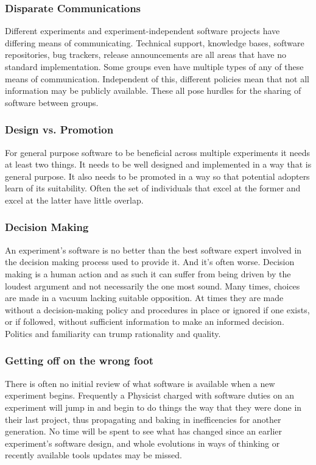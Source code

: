 \subsubsection{Disparate Communications}

Different experiments and experiment-independent software projects
have differing means of communicating.  Technical support, knowledge
bases, software repositories, bug trackers, release announcements are
all areas that have no standard implementation.  Some groups even
have multiple types of any of these means of communication.
Independent of this, different policies mean that not all information
may be publicly available.  These all pose hurdles for the sharing of 
software between groups.

\subsubsection{Design vs. Promotion}

For general purpose software to be beneficial across multiple
experiments it needs at least two things.  It needs to be well
designed and implemented in a way that is general purpose.  It
also needs to be promoted in a way so that potential adopters learn of
its suitability.  Often the set of individuals that excel at the
former and excel at the latter have little overlap.

\subsubsection{Decision Making}

An experiment's software is no better than the best software expert
involved in the decision making process used to provide it. And it's often worse.
Decision making is a human action and as such it can suffer from being
driven by the loudest argument and not necessarily the one most sound.
Many times, choices are made in a vacuum lacking suitable opposition.
At times they are made without a decision-making policy and procedures in place or
ignored if one exists, or if followed, without sufficient information
to make an informed decision.  Politics and familiarity can trump
rationality and quality.

\subsubsection{Getting off on the wrong foot}

There is often no initial review of what software is available when a new experiment begins.
Frequently a Physicist charged with software duties on an experiment will 
jump in and begin to do things the way that they were done in their 
last project, thus propagating and baking in inefficencies for another generation.  
No time will be spent to see what has changed since an earlier experiment's 
software design, and whole evolutions in ways of thinking or recently available
tools updates may be missed.



